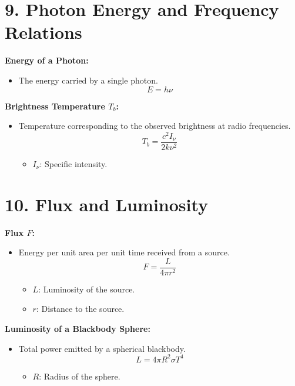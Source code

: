 \documentclass{article}
\begin{document}
\section*{9. Photon Energy and Frequency Relations}

\textbf{Energy of a Photon:}
\begin{itemize}
    \item The energy carried by a single photon.
          \[
              E = h\nu
          \]
\end{itemize}

\textbf{Brightness Temperature \( T_b \):}
\begin{itemize}
    \item Temperature corresponding to the observed brightness at radio frequencies.
          \[
              T_b = \frac{c^2 I_\nu}{2 k \nu^2}
          \]
          \begin{itemize}
              \item \( I_\nu \): Specific intensity.
          \end{itemize}
\end{itemize}

\section*{10. Flux and Luminosity}

\textbf{Flux \( F \):}
\begin{itemize}
    \item Energy per unit area per unit time received from a source.
          \[
              F = \frac{L}{4\pi r^2}
          \]
          \begin{itemize}
              \item \( L \): Luminosity of the source.
              \item \( r \): Distance to the source.
          \end{itemize}
\end{itemize}

\textbf{Luminosity of a Blackbody Sphere:}
\begin{itemize}
    \item Total power emitted by a spherical blackbody.
          \[
              L = 4\pi R^2 \sigma T^4
          \]
          \begin{itemize}
              \item \( R \): Radius of the sphere.
          \end{itemize}
\end{itemize}
\end{document}

